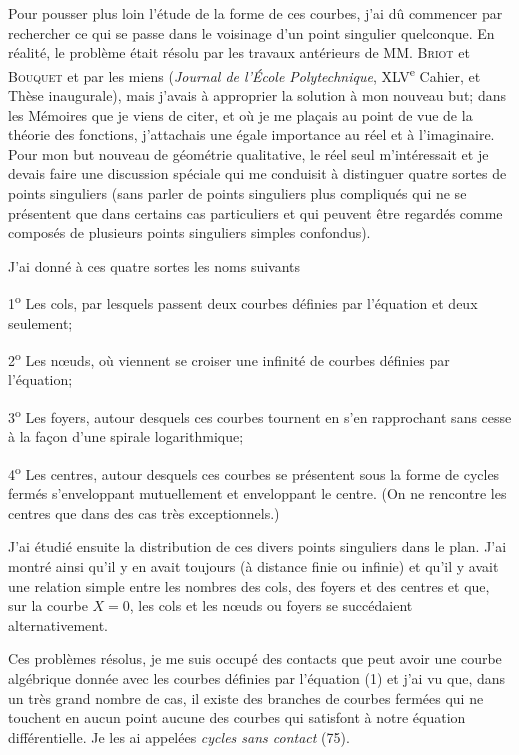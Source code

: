 \documentclass[11pt]{article}
\begin{document}
Pour pousser plus loin l’étude de la forme de ces courbes, j’ai dû commencer par rechercher ce qui se passe dans le voisinage d’un point singulier quelconque. En réalité, le problème était résolu par les travaux antérieurs de MM. \textsc{Briot} et \textsc{Bouquet} et par les miens (\emph{Journal de l’École Polytechnique}, XLV\textsuperscript{e} Cahier, et Thèse inaugurale), mais j’avais à approprier la solution à mon nouveau but; dans les Mémoires que je viens de citer, et où je me plaçais au point de vue de la théorie des fonctions, j’attachais une égale importance au réel et à l’imaginaire. Pour mon but nouveau de géométrie qualitative, le réel seul m’intéressait et je devais faire une discussion spéciale qui me conduisit à distinguer quatre sortes de points singuliers (sans parler de points singuliers plus compliqués qui ne se présentent que dans certains cas particuliers et qui peuvent être regardés comme composés de plusieurs points singuliers simples confondus).

J’ai donné à ces quatre sortes les noms suivants

1\textsuperscript{o} Les cols, par lesquels passent deux courbes définies par l’équation et deux seulement;

2\textsuperscript{o} Les nœuds, où viennent se croiser une infinité de courbes définies par l’équation;

3\textsuperscript{o} Les foyers, autour desquels ces courbes tournent en s’en rapprochant sans cesse à la façon d’une spirale logarithmique;

4\textsuperscript{o} Les centres, autour desquels ces courbes se présentent sous la forme de cycles fermés s’enveloppant mutuellement et enveloppant le centre. (On ne rencontre les centres que dans des cas très exceptionnels.)

J’ai étudié ensuite la distribution de ces divers points singuliers dans le plan. J’ai montré ainsi qu’il y en avait toujours (à distance finie ou infinie) et qu’il y avait une relation simple entre les nombres des cols, des foyers et des centres et que, sur la courbe $X=0$, les cols et les nœuds ou foyers se succédaient alternativement.

Ces problèmes résolus, je me suis occupé des contacts que peut avoir une courbe algébrique donnée avec les courbes définies par l’équation (1) et j’ai vu que, dans un très grand nombre de cas, il existe des branches de courbes fermées qui ne touchent en aucun point aucune des courbes qui satisfont à notre équation différentielle. Je les ai appelées \emph{cycles sans contact} (75).
\end{document}
